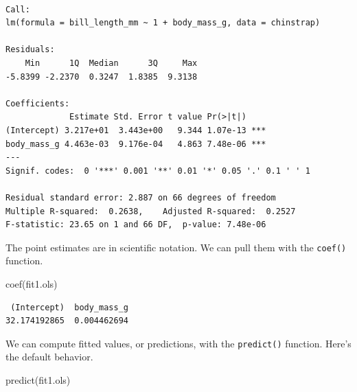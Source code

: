 \documentclass[
  letterpaper,
  DIV=11,
  numbers=noendperiod]{scrartcl}
\newenvironment{Shaded}{\begin{snugshade}}{\end{snugshade}}
\newcommand{\FunctionTok}[1]{\textcolor[rgb]{0.28,0.35,0.67}{#1}}
\newcommand{\NormalTok}[1]{\textcolor[rgb]{0.00,0.23,0.31}{#1}}
\begin{document}
\begin{verbatim}

Call:
lm(formula = bill_length_mm ~ 1 + body_mass_g, data = chinstrap)

Residuals:
    Min      1Q  Median      3Q     Max 
-5.8399 -2.2370  0.3247  1.8385  9.3138 

Coefficients:
             Estimate Std. Error t value Pr(>|t|)    
(Intercept) 3.217e+01  3.443e+00   9.344 1.07e-13 ***
body_mass_g 4.463e-03  9.176e-04   4.863 7.48e-06 ***
---
Signif. codes:  0 '***' 0.001 '**' 0.01 '*' 0.05 '.' 0.1 ' ' 1

Residual standard error: 2.887 on 66 degrees of freedom
Multiple R-squared:  0.2638,    Adjusted R-squared:  0.2527 
F-statistic: 23.65 on 1 and 66 DF,  p-value: 7.48e-06
\end{verbatim}

The point estimates are in scientific notation. We can pull them with
the \texttt{coef()} function.

\begin{Shaded}
\begin{Highlighting}[]
\FunctionTok{coef}\NormalTok{(fit1.ols)}
\end{Highlighting}
\end{Shaded}

\begin{verbatim}
 (Intercept)  body_mass_g 
32.174192865  0.004462694 
\end{verbatim}

We can compute fitted values, or predictions, with the
\texttt{predict()} function. Here's the default behavior.

\begin{Shaded}
\begin{Highlighting}[]
\FunctionTok{predict}\NormalTok{(fit1.ols)}
\end{Highlighting}
\end{Shaded}
\end{document}
